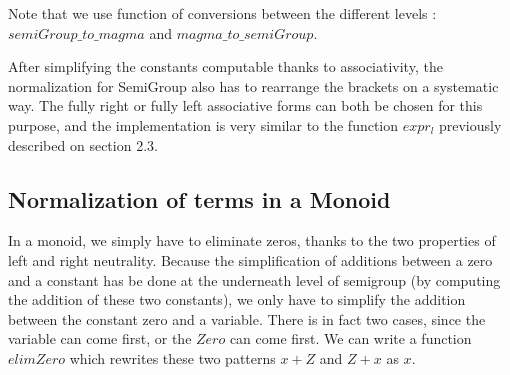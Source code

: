 Note that we use function of conversions between the different levels : $semiGroup\_to\_magma$ and $magma\_to\_semiGroup$.

After simplifying the constants computable thanks to associativity, the normalization for SemiGroup also has to rearrange the brackets on a systematic way. The fully right or fully left associative forms can both be chosen for this purpose, and the implementation is very similar to the function $expr_l$ previously described on section 2.3.

\subsection {Normalization of terms in a Monoid}

In a monoid, we simply have to eliminate zeros, thanks to the two properties of left and right neutrality. Because the simplification of additions between a zero and a constant has be done at the underneath level of semigroup (by computing the addition of these two constants), we only have to simplify the addition between the constant zero and a variable. There is in fact two cases, since the variable can come first, or the $Zero$ can come first. We can write a function $elimZero$ which rewrites these two patterns $x+Z$ and $Z+x$ as $x$.


